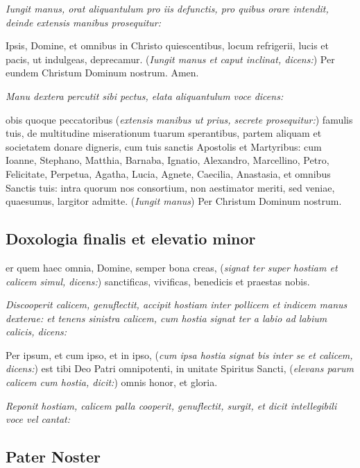 \textit{%
    Iungit manus, orat aliquantulum pro iis defunctis, pro quibus orare
    intendit, deinde extensis manibus prosequitur:
}

Ipsis, Domine, et omnibus in Christo quiescentibus, locum refrigerii, lucis et
pacis, ut indulgeas, deprecamur.  (\textit{Iungit manus et caput inclinat,
dicens:}) Per eundem Christum Dominum nostrum.  Amen.

\textit{Manu dextera percutit sibi pectus, elata aliquantulum voce dicens:}

obis quoque peccatoribus (\textit{extensis manibus ut prius,
secrete prosequitur:}) famulis tuis, de multitudine miserationum tuarum
sperantibus, partem aliquam et societatem donare digneris, cum tuis sanctis
Apostolis et Martyribus: cum Ioanne, Stephano, Matthia, Barnaba, Ignatio,
Alexandro, Marcellino, Petro, Felicitate, Perpetua, Agatha, Lucia, Agnete,
Caecilia, Anastasia, et omnibus Sanctis tuis: intra quorum nos consortium, non
aestimator meriti, sed veniae, quaesumus, largitor admitte.  (\textit{Iungit
manus}) Per Christum Dominum nostrum.

\subsection{Doxologia finalis et elevatio minor}

er quem haec omnia, Domine, semper bona creas, (\textit{signat ter
super hostiam et calicem simul, dicens:}) sancti\cross{}ficas,
vivi\cross{}ficas, bene\cross{}dicis et praestas nobis.

\textit{%
    Discooperit calicem, genuflectit, accipit hostiam inter pollicem et indicem
    manus dexterae: et tenens sinistra calicem, cum hostia signat ter a labio ad
    labium calicis, dicens:
}

Per ip\cross{}sum, et cum ip\cross{}so, et in ip\cross{}so, (\textit{cum ipsa
hostia signat bis inter se et calicem, dicens:}) est tibi Deo Patri \cross{}
omnipotenti, in unitate Spiritus \cross{} Sancti, (\textit{elevans parum calicem
cum hostia, dicit:}) omnis honor, et gloria.

\textit{%
    Reponit hostiam, calicem palla cooperit, genuflectit, surgit, et dicit
    intellegibili voce vel cantat:
}



\subsection{Pater Noster}

